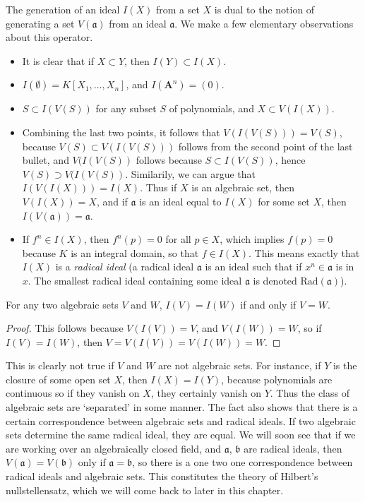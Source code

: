 The generation of an ideal $I(X)$ from a set $X$ is dual to the notion of generating a set $V(\mathfrak{a})$ from an ideal $\mathfrak{a}$. We make a few elementary observations about this operator.
%
\begin{itemize}
    \item It is clear that if $X \subset Y$, then $I(Y) \subset I(X)$.
    \item $I(\emptyset) = K[X_1, \dots, X_n]$, and $I(\mathbf{A}^n) = (0)$.
    \item $S \subset I(V(S))$ for any subset $S$ of polynomials, and $X \subset V(I(X))$.
    \item Combining the last two points, it follows that $V(I(V(S))) = V(S)$, because $V(S) \subset V(I(V(S)))$ follows from the second point of the last bullet, and $V(I(V(S))$ follows because $S \subset I(V(S))$, hence $V(S) \supset V(I(V(S))$. Similarily, we can argue that $I(V(I(X))) = I(X)$. Thus if $X$ is an algebraic set, then $V(I(X)) = X$, and if $\mathfrak{a}$ is an ideal equal to $I(X)$ for some set $X$, then $I(V(\mathfrak{a})) = \mathfrak{a}$.
    \item If $f^n \in I(X)$, then $f^n(p) = 0$ for all $p \in X$, which implies $f(p) = 0$ because $K$ is an integral domain, so that $f \in I(X)$. This means exactly that $I(X)$ is a {\it radical ideal} (a radical ideal $\mathfrak{a}$ is an ideal such that if $x^n \in \mathfrak{a}$ is in $x$. The smallest radical ideal containing some ideal $\mathfrak{a}$ is denoted $\text{Rad}(\mathfrak{a})$).
\end{itemize}

\begin{prop}
    For any two algebraic sets $V$ and $W$, $I(V) = I(W)$ if and only if $V = W$.
\end{prop}
\begin{proof}
    This follows because $V(I(V)) = V$, and $V(I(W)) = W$, so if $I(V) = I(W)$, then $V = V(I(V)) = V(I(W)) = W$.
\end{proof}

This is clearly not true if $V$ and $W$ are not algebraic sets. For instance, if $Y$ is the closure of some open set $X$, then $I(X) = I(Y)$, because polynomials are continuous so if they vanish on $X$, they certainly vanish on $Y$. Thus the class of algebraic sets are `separated' in some manner. The fact also shows that there is a certain correspondence between algebraic sets and radical ideals. If two algebraic sets determine the same radical ideal, they are equal. We will soon see that if we are working over an algebraically closed field, and $\mathfrak{a}$, $\mathfrak{b}$ are radical ideals, then $V(\mathfrak{a}) = V(\mathfrak{b})$ only if $\mathfrak{a} = \mathfrak{b}$, so there is a one two one correspondence between radical ideals and algebraic sets. This constitutes the theory of Hilbert's nullstellensatz, which we will come back to later in this chapter.

